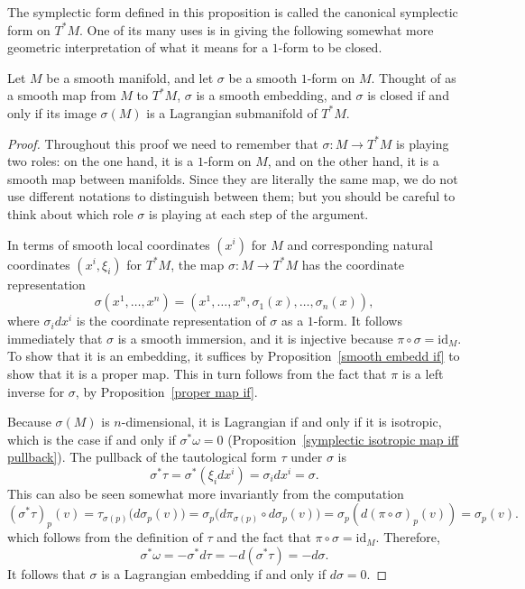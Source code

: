 The symplectic form defined in this proposition is called the canonical symplectic form on $T^*M$. One of its many uses is in giving the following somewhat more geometric interpretation of what it means for a $1$-form to be closed.
\begin{proposition}\label{one form is embedding}
Let $M$ be a smooth manifold, and let $\sigma$ be a smooth $1$-form on $M$. Thought of as a smooth map from $M$ to $T^*M$, $\sigma$ is a smooth embedding, and $\sigma$ is closed if and only if its image $\sigma(M)$ is a Lagrangian submanifold of $T^*M$.
\end{proposition}
\begin{proof}
Throughout this proof we need to remember that  $\sigma:M\to T^*M$ is playing two roles: on the one hand, it is a $1$-form on $M$, and on the other hand, it is a smooth map between manifolds. Since they are literally the same map, we do not use different notations to distinguish between them; but you should be careful to think about which role $\sigma$ is playing at each step of the argument.\par
In terms of smooth local coordinates $(x^i)$ for $M$ and corresponding natural coordinates $(x^i,\xi_i)$ for $T^*M$, the map $\sigma:M\to T^*M$ has the coordinate representation
\[\sigma(x^1,\dots,x^n)=(x^1,\dots,x^n,\sigma_1(x),\dots,\sigma_n(x)),\]
where $\sigma_idx^i$ is the coordinate representation of $\sigma$ as a $1$-form. It follows immediately that $\sigma$ is a smooth immersion, and it is injective because 
$\pi\circ\sigma=\mathrm{id}_M$. To show that it is an embedding, it suffices by Proposition~\ref{smooth embedd if} to show that it is a proper map. This in turn follows from the fact that $\pi$ is a left inverse for $\sigma$, by Proposition~\ref{proper map if}.\par
Because $\sigma(M)$ is $n$-dimensional, it is Lagrangian if and only if it is isotropic, which is the case if and only if  $\sigma^*\omega=0$ (Proposition~\ref{symplectic isotropic map iff pullback}). The pullback of the tautological form $\tau$ under $\sigma$ is
\[\sigma^*\tau=\sigma^*(\xi_idx^i)=\sigma_idx^i=\sigma.\]
This can also be seen somewhat more invariantly from the computation
\[(\sigma^*\tau)_p(v)=\tau_{\sigma(p)}\big(d\sigma_p(v)\big)=\sigma_p\big(d\pi_{\sigma(p)}\circ d\sigma_p(v)\big)=\sigma_p(d(\pi\circ\sigma)_p(v))=\sigma_p(v).\]
which follows from the definition of $\tau$ and the fact that $\pi\circ\sigma=\mathrm{id}_M$. Therefore,
\[\sigma^*\omega=-\sigma^*d\tau=-d(\sigma^*\tau)=-d\sigma.\]
It follows that $\sigma$ is a Lagrangian embedding if and only if $d\sigma=0$.
\end{proof}
